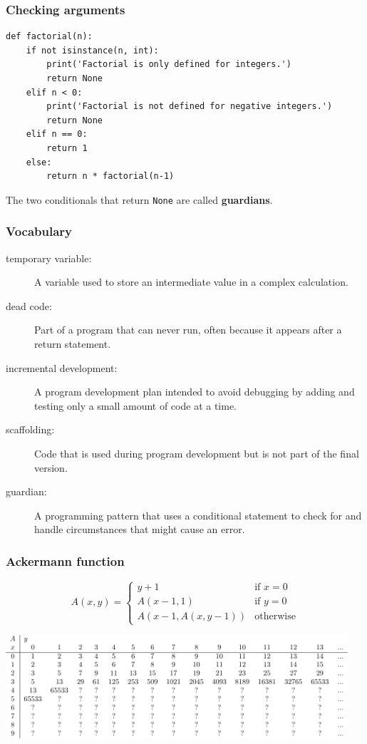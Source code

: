 \documentclass{beamer}
\newcommand{\li}{\item}
\newcommand{\bfr}[1]{\begin{frame}[fragile]\frametitle{{ #1 }}}
\begin{document}
\bfr{Checking arguments}
\begin{lstlisting}
def factorial(n):
    if not isinstance(n, int):
        print('Factorial is only defined for integers.')
        return None
    elif n < 0:
        print('Factorial is not defined for negative integers.')
        return None
    elif n == 0:
        return 1
    else:
        return n * factorial(n-1)
\end{lstlisting}

The two conditionals that return \verb|None|
are called {\bf guardians}.


\end{frame}

\bfr{Vocabulary}
\begin{description}

\li[temporary variable:]
A variable used to store an intermediate value in a complex calculation.
\li[dead code:]
Part of a program that can never run, often because it appears after a return statement.
\li[incremental development:]
A program development plan intended to avoid debugging by adding and testing only a small amount of code at a time.
\li[scaffolding:]
Code that is used during program development but is not part of the final version.
\li[guardian:]
A programming pattern that uses a conditional statement to check for and handle circumstances that might cause an error.
\end{description}
\end{frame}

\begin{frame}

\frametitle{Ackermann function}
\[
  A(x,y) = \left\{\begin{array}{ll}y+1 & \mbox{if\ } x = 0\\
                                A(x-1,1) & \mbox{if\ } y=0\\
                                A(x-1,A(x,y-1)) &\mbox{otherwise}
                   \end{array}\right.
\]

\pause
\bigskip

\hspace*{-0.35in}\includegraphics[width=5in]{ackermann.pdf}

\end{frame}
\end{document}
